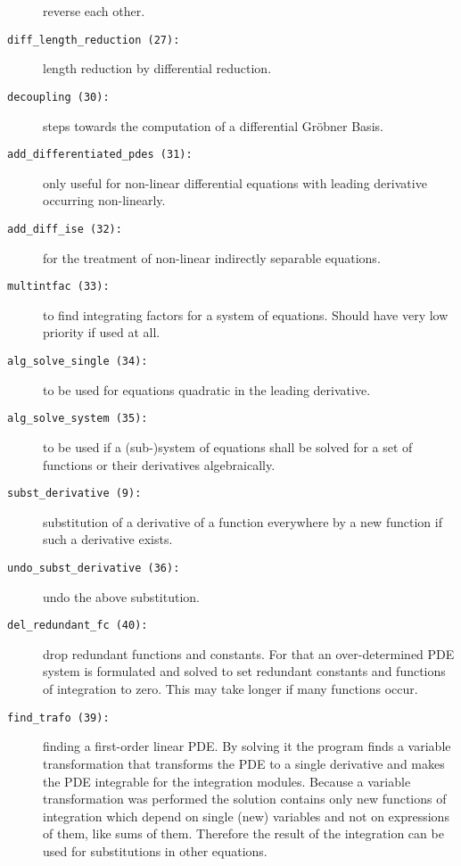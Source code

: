 \begin{description}
  reverse each other.
\item[\texttt{diff\_length\_reduction
    \hypertarget{crack-m_27}{(27)}:}] length reduction by differential
  reduction.
\item[\texttt{decoupling \hypertarget{crack-m_30}{(30)}:}] steps
  towards the computation of a differential Gr\"{o}bner Basis.
\item[\texttt{add\_differentiated\_pdes
    \hypertarget{crack-m_31}{(31)}:}] only useful for non-linear
  differential equations with leading derivative occurring
  non-linearly.
\item[\texttt{add\_diff\_ise \hypertarget{crack-m_32}{(32)}:}] for the
  treatment of non-linear indirectly separable equations.
\item[\texttt{multintfac \hypertarget{crack-m_33}{(33)}:}] to find
  integrating factors for a system of equations.  Should have very low
  priority if used at all.
\item[\texttt{alg\_solve\_single \hypertarget{crack-m_34}{(34)}:}] to
  be used for equations quadratic in the leading derivative.
\item[\texttt{alg\_solve\_system \hypertarget{crack-m_35}{(35)}:}] to
  be used if a (sub-)system of equations shall be solved for a set of
  functions or their derivatives algebraically.
\item[\texttt{subst\_derivative \hypertarget{crack-m_9}{(9)}:}]
  substitution of a derivative of a function everywhere by a new
  function if such a derivative exists.
\item[\texttt{undo\_subst\_derivative
    \hypertarget{crack-m_36}{(36)}:}] undo the above substitution.
\item[\texttt{del\_redundant\_fc \hypertarget{crack-m_40}{(40)}:}]
  drop redundant functions and constants.  For that an over-determined
  PDE system is formulated and solved to set redundant constants and
  functions of integration to zero.  This may take longer if many
  functions occur.
\item[\texttt{find\_trafo \hypertarget{crack-m_39}{(39)}:}] finding a
  first-order linear PDE.  By solving it the program finds a variable
  transformation that transforms the PDE to a single derivative and
  makes the PDE integrable for the integration modules.  Because a
  variable transformation was performed the solution contains only new
  functions of integration which depend on single (new) variables and
  not on expressions of them, like sums of them.  Therefore the result
  of the integration can be used for substitutions in other equations.

\end{description}
